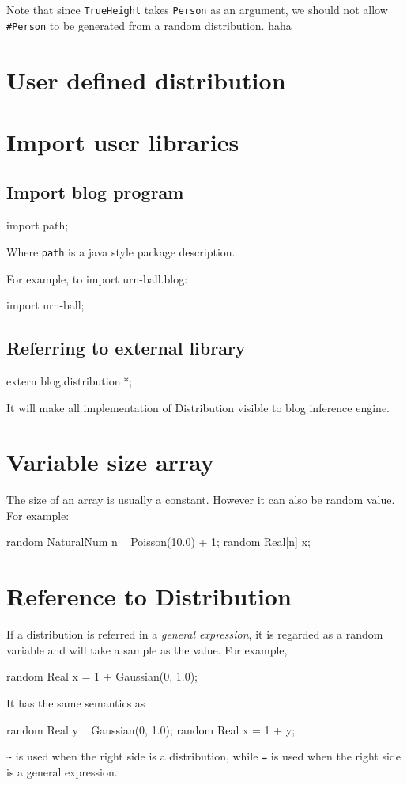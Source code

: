 \documentclass[12pt]{article}
\begin{document}
Note that since \texttt{TrueHeight} takes \texttt{Person} as an argument, we should not allow \texttt{\#Person} to be generated from a random distribution.
haha

\section{User defined distribution}

\section{Import user libraries}
\subsection{Import blog program}
\begin{blogcode}
import path;
\end{blogcode}
Where \texttt{path} is a java style package description.

For example, to import urn-ball.blog:
\begin{blogcode}
import urn-ball;
\end{blogcode}

\subsection{Referring to external library}
\begin{blogcode}
extern blog.distribution.*;
\end{blogcode}
It will make all implementation of Distribution visible to blog inference engine.


\section{Variable size array}
The size of an array is usually a constant. However it can also be random value.
For example:
\begin{blogcode}
random NaturalNum n ~ Poisson(10.0) + 1;
random Real[n] x;
\end{blogcode}


\section{Reference to Distribution}
If a distribution is referred in a \emph{general expression}, it is regarded as a random variable and will take a sample as the value.
For example, 
\begin{blogcode}
random Real x = 1 + Gaussian(0, 1.0);
\end{blogcode}
It has the same semantics as
\begin{blogcode}
random Real y ~ Gaussian(0, 1.0);
random Real x = 1 + y;
\end{blogcode}
\texttt{\~{}} is used when the right side is a distribution, while \texttt{=} is used when the right side is a general expression. 

\end{document}
